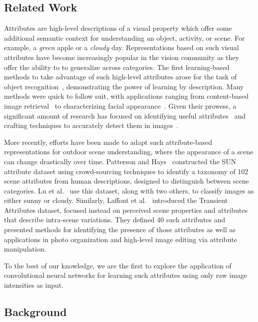 \documentclass[10pt,twocolumn,letterpaper]{article}
\begin{document}
\subsection{Related Work}
\indent
Attributes are high-level descriptions of a visual property which offer some
additional semantic context for understanding an object, activity, or scene.
For example, a \emph{green} apple or a \emph{cloudy} day. Representations based
on such visual attributes have become increasingly popular in the vision
community as they offer the ability to to generalize across categories. The
first learning-based methods to take advantage of such high-level attributes
arose for the task of object
recognition~\cite{farhadi2009describing,lampert2009learning}, demonstrating the
power of learning by description. Many methods were quick to follow suit, with
applications ranging from content-based image
retrieval~\cite{siddiquie2011image} to characterizing facial
appearance~\cite{kumar2011describable}. Given their prowess, a significant
amount of research has focused on identifying useful
attributes~\cite{berg2010automatic} and crafting techniques to accurately
detect them in images~\cite{vedaldi2014understanding}. 

More recently, efforts have been made to adapt such attribute-based
representations for outdoor scene understanding, where the appearance of a
scene can change drastically over time.  Patterson and
Hays~\cite{patterson2012sun} constructed the SUN attribute dataset using
crowd-sourcing techniques to identify a taxonomy of 102 scene attributes from
human descriptions, designed to distinguish between scene categories. Lu et
al.~\cite{lutwoclass} use this dataset, along with two others, to classify
images as either sunny or cloudy.  Similarly, Laffont et al.~\cite{Laffont14}
introduced the Transient Attributes dataset, focused instead on perceived scene
properties and attributes that describe intra-scene variations. They defined 40
such attributes and presented methods for identifying the presence of those
attributes as well as applications in photo organization and high-level image
editing via attribute manipulation. 

To the best of our knowledge, we are the first to explore the application of
convolutional neural networks for learning such attributes using only raw
image intensities as input.

\subsection{Background}
\end{document}
